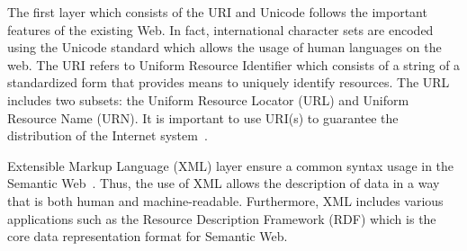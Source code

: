 The first layer which consists of the URI and Unicode follows the important features of the existing Web. In fact, international character sets are encoded using the Unicode standard which allows the usage of human languages on the web. The URI refers to Uniform Resource Identifier which consists of a string of a standardized form that provides means to uniquely identify resources. The URL includes two subsets: the Uniform Resource Locator (URL) and Uniform Resource Name (URN). It is important to use URI(s) to guarantee the distribution of the Internet system~\cite{layer2}. \par 

Extensible Markup Language (XML) layer ensure a common syntax usage in the Semantic Web~\cite{layer2}. Thus, the use of XML allows the description of data in a way that is both human and machine-readable. Furthermore, XML includes various applications such as the Resource Description Framework (RDF) which is the core data representation format for Semantic Web. \par

